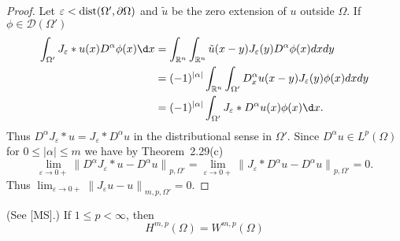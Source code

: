 \begin{proof}
  Let $\varepsilon<\operatorname{dist} (\Omega', \partial\Omega)$ 
  and $\tilde{u}$ be the zero extension of $u$ outside $\Omega$.
  If $\phi \in \mathscr{D}\left(\Omega'\right)$
  \[
  \begin{aligned}
    \int_{\Omega'} J_\varepsilon * u(x) D^\alpha \phi(x) \d x
    & = \int_{\mathbb{R}^n} \int_{\mathbb{R}^n} \tilde{u}(x-y) J_\varepsilon(y) 
        D^\alpha \phi(x) d x d y \\
    & = (-1)^{|\alpha|} \int_{\mathbb{R}^n} \int_{\Omega'}
        D_x^\alpha u(x-y) J_\varepsilon(y) \phi(x) d x d y \\
    & = (-1)^{|\alpha|} \int_{\Omega'} J_\varepsilon * D^\alpha u(x) \phi(x) \d x .
  \end{aligned}
  \]
  Thus $D^\alpha J_\varepsilon * u=J_\varepsilon * D^\alpha u$ in the distributional sense
  in $\Omega'$. Since $D^\alpha u \in L^p(\Omega)$ for $0 \leq|\alpha| \leq m$
  we have by Theorem~2.29(c)
  \[
  \lim _{\varepsilon \rightarrow 0+}\left\|D^\alpha J_\varepsilon * u-D^\alpha u\right\|_{p, \Omega'}=\lim _{\varepsilon \rightarrow 0+}\left\|J_\varepsilon * D^\alpha u-D^\alpha u\right\|_{p, \Omega'}=0 .
  \]
  Thus $\lim _{\varepsilon \rightarrow 0+}\left\|J_\varepsilon u-u\right\|_{m, p, \Omega'}=0$.
\end{proof}


\begin{theorem}[$\bm{H} = \bm{W}$]
  (See [MS].) If $1 \leq p<\infty$, then
  \[
  H^{m, p}(\Omega)=W^{m,p}(\Omega)
  \]
\end{theorem}

